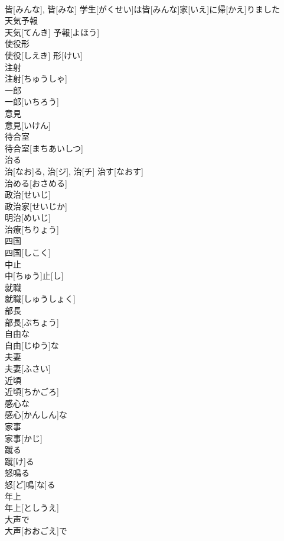 \documentclass[8pt]{extreport}
\begin{document}
\begin{CJK}{UTF8}{min}
\\	皆[みんな], 皆[みな]	学生[がくせい]は皆[みんな]家[いえ]に帰[かえ]りました 
\\	天気予報	
\\	天気[てんき] 予報[よほう]	
\\	使役形	
\\	使役[しえき] 形[けい]	
\\	注射	
\\	注射[ちゅうしゃ]	
\\	一郎	
\\	一郎[いちろう]	
\\	意見	
\\	意見[いけん]	
\\	待合室	
\\	待合室[まちあいしつ]	
\\	治る	
\\	治[なお]る, 治[ジ], 治[チ]	治す[なおす] 
\\	治める[おさめる] 
\\	政治[せいじ] 
\\	政治家[せいじか] 
\\	明治[めいじ] 
\\	治療[ちりょう] 
\\	四国	
\\	四国[しこく]	
\\	中止	
\\	中[ちゅう]止[し]	
\\	就職	
\\	就職[しゅうしょく]	
\\	部長	
\\	部長[ぶちょう]	
\\	自由な	
\\	自由[じゆう]な	
\\	夫妻	
\\	夫妻[ふさい]	
\\	近頃	
\\	近頃[ちかごろ]	
\\	感心な	
\\	感心[かんしん]な	
\\	家事	
\\	家事[かじ]	
\\	蹴る	
\\	蹴[け]る	
\\	怒鳴る	
\\	怒[ど]鳴[な]る	
\\	年上	
\\	年上[としうえ]	
\\	大声で	
\\	大声[おおごえ]で	

\end{CJK}
\end{document}
